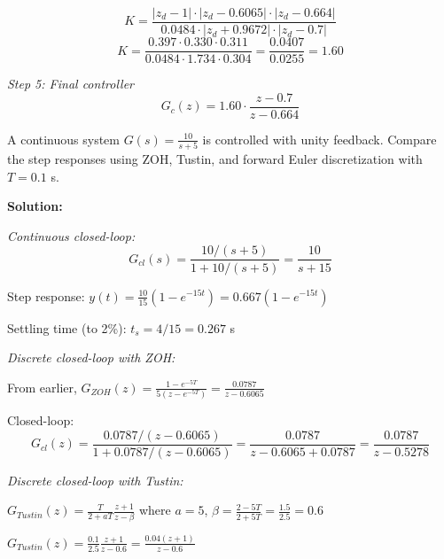 \begin{example}
\begin{equation}
K = \frac{|z_d - 1| \cdot |z_d - 0.6065| \cdot |z_d - 0.664|}{0.0484 \cdot |z_d + 0.9672| \cdot |z_d - 0.7|}
\end{equation}
\begin{equation}
K = \frac{0.397 \cdot 0.330 \cdot 0.311}{0.0484 \cdot 1.734 \cdot 0.304} = \frac{0.0407}{0.0255} = 1.60
\end{equation}

\textit{Step 5: Final controller}
\begin{equation}
\boxed{G_c(z) = 1.60 \cdot \frac{z - 0.7}{z - 0.664}}
\end{equation}
\end{example}

\begin{example}
\label{ex:discretization_accuracy}

A continuous system $G(s) = \frac{10}{s + 5}$ is controlled with unity feedback. Compare the step responses using ZOH, Tustin, and forward Euler discretization with $T = 0.1$ s.

\textbf{Solution:}

\textit{Continuous closed-loop:}
\begin{equation}
G_{cl}(s) = \frac{10/(s+5)}{1 + 10/(s+5)} = \frac{10}{s + 15}
\end{equation}

Step response: $y(t) = \frac{10}{15}(1 - e^{-15t}) = 0.667(1 - e^{-15t})$

Settling time (to 2\%): $t_s = 4/15 = 0.267$ s

\textit{Discrete closed-loop with ZOH:}

From earlier, $G_{ZOH}(z) = \frac{1 - e^{-5T}}{5(z - e^{-5T})} = \frac{0.0787}{z - 0.6065}$

Closed-loop:
\begin{equation}
G_{cl}(z) = \frac{0.0787/(z - 0.6065)}{1 + 0.0787/(z - 0.6065)} = \frac{0.0787}{z - 0.6065 + 0.0787} = \frac{0.0787}{z - 0.5278}
\end{equation}

\textit{Discrete closed-loop with Tustin:}

$G_{Tustin}(z) = \frac{T}{2+aT}\frac{z+1}{z-\beta}$ where $a = 5$, $\beta = \frac{2-5T}{2+5T} = \frac{1.5}{2.5} = 0.6$

$G_{Tustin}(z) = \frac{0.1}{2.5}\frac{z+1}{z-0.6} = \frac{0.04(z+1)}{z-0.6}$


\end{example}
